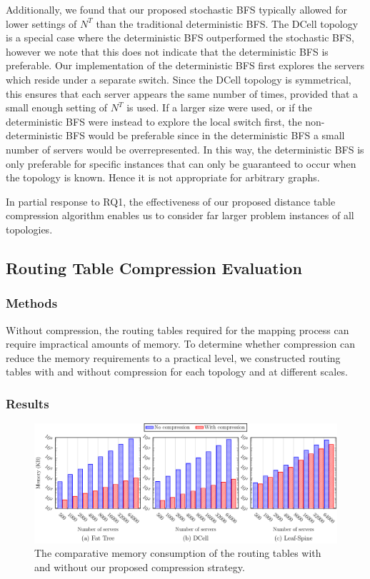 Additionally, we found that our proposed stochastic BFS typically allowed for lower settings of $N^T$ than the traditional deterministic BFS. The DCell topology is a special case where the deterministic BFS outperformed the stochastic BFS, however we note that this does not indicate that the deterministic BFS is preferable. Our implementation of the deterministic BFS first explores the servers which reside under a separate switch. Since the DCell topology is symmetrical, this ensures that each server appears the same number of times, provided that a small enough setting of $N^T$ is used. If a larger size were used, or if the deterministic BFS were instead to explore the local switch first, the non-deterministic BFS would be preferable since in the deterministic BFS a small number of servers would be overrepresented. In this way, the deterministic BFS is only preferable for specific instances that can only be guaranteed to occur when the topology is known. Hence it is not appropriate for arbitrary graphs.

In partial response to RQ1, the effectiveness of our proposed distance table compression algorithm enables us to consider far larger problem instances of all topologies.

\subsection{Routing Table Compression Evaluation}
\label{sec:routing_compression}

\subsubsection{Methods}
Without compression, the routing tables required for the mapping process can require impractical amounts of memory. To determine whether compression can reduce the memory requirements to a practical level, we constructed routing tables with and without compression for each topology and at different scales.

\subsubsection{Results}

\begin{figure}[t!]
    \centering
    \includegraphics[width=\linewidth]{figures/graphs/routing_table/routing_tables}

    \caption{The comparative memory consumption of the routing tables with and without our proposed compression strategy.}
    \label{fig:rt_compression}
\end{figure}

